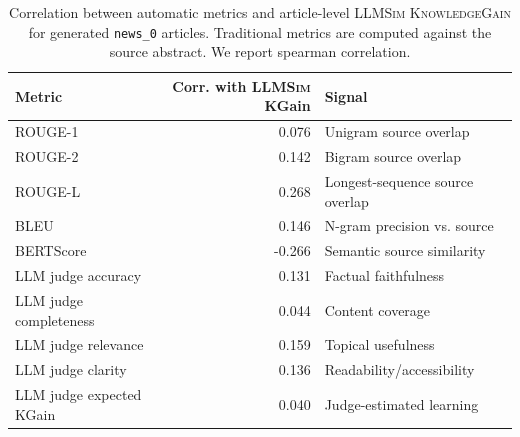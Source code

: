 \begin{table}[t]
\centering
\small
\setlength{\tabcolsep}{5pt}
\begin{tabular}{lrl}
\toprule
Metric & Corr. with \textsc{LLMSim} KGain & Signal \\
\midrule
ROUGE-1 & 0.076 & Unigram source overlap \\
ROUGE-2 & 0.142 & Bigram source overlap \\
ROUGE-L & 0.268 & Longest-sequence source overlap \\
BLEU & 0.146 & N-gram precision vs. source \\
BERTScore & -0.266 & Semantic source similarity \\
LLM judge accuracy & 0.131 & Factual faithfulness \\
LLM judge completeness & 0.044 & Content coverage \\
LLM judge relevance & 0.159 & Topical usefulness \\
LLM judge clarity & 0.136 & Readability/accessibility \\
LLM judge expected KGain & 0.040 & Judge-estimated learning \\
\bottomrule
\end{tabular}
\caption{Correlation between automatic metrics and article-level \textsc{LLMSim} \textsc{KnowledgeGain} for generated \texttt{news\_0} articles. Traditional metrics are computed against the source abstract. We report spearman correlation.}
\label{tab:metrics_vs_llmsim_kgain}
\end{table}
